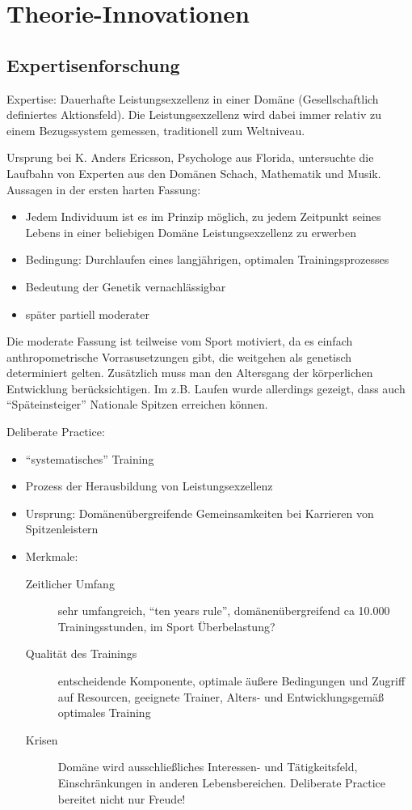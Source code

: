 
\section{Theorie-Innovationen}

\subsection{Expertisenforschung}

Expertise: Dauerhafte Leistungsexzellenz in einer Domäne (Gesellschaftlich definiertes Aktionsfeld). Die Leistungsexzellenz wird dabei immer relativ zu einem Bezugssystem gemessen, traditionell zum Weltniveau.

Ursprung bei K. Anders Ericsson, Psychologe aus Florida, untersuchte die Laufbahn von Experten aus den Domänen Schach, Mathematik und Musik. Aussagen in der ersten harten Fassung:
\begin{itemize}
    \item Jedem Individuum ist es im Prinzip möglich, zu jedem Zeitpunkt seines Lebens in einer beliebigen Domäne Leistungsexzellenz zu erwerben
    \item Bedingung: Durchlaufen eines langjährigen, optimalen Trainingsprozesses
    \item Bedeutung der Genetik vernachlässigbar
    \item später partiell moderater
\end{itemize}

Die moderate Fassung ist teilweise vom Sport motiviert, da es einfach anthropometrische Vorrasusetzungen gibt, die weitgehen als genetisch determiniert gelten. Zusätzlich muss man den Altersgang der körperlichen Entwicklung berücksichtigen. Im z.B. Laufen wurde allerdings gezeigt, dass auch ``Späteinsteiger'' Nationale Spitzen erreichen können.

Deliberate Practice:
\begin{itemize}
    \item ``systematisches'' Training
    \item Prozess der Herausbildung von Leistungsexzellenz
    \item Ursprung: Domänenübergreifende Gemeinsamkeiten bei Karrieren von Spitzenleistern
    \item Merkmale:
    \begin{description}
        \item [Zeitlicher Umfang] sehr umfangreich, ``ten years rule'', domänenübergreifend ca 10.000 Trainingsstunden, im Sport Überbelastung?
        \item [Qualität des Trainings] entscheidende Komponente, optimale äußere Bedingungen und Zugriff auf Resourcen, geeignete Trainer, Alters- und Entwicklungsgemäß optimales Training
        \item [Krisen] Domäne wird ausschließliches Interessen- und Tätigkeitsfeld, Einschränkungen in anderen Lebensbereichen. Deliberate Practice bereitet nicht nur Freude!
    \end{description}
\end{itemize}

